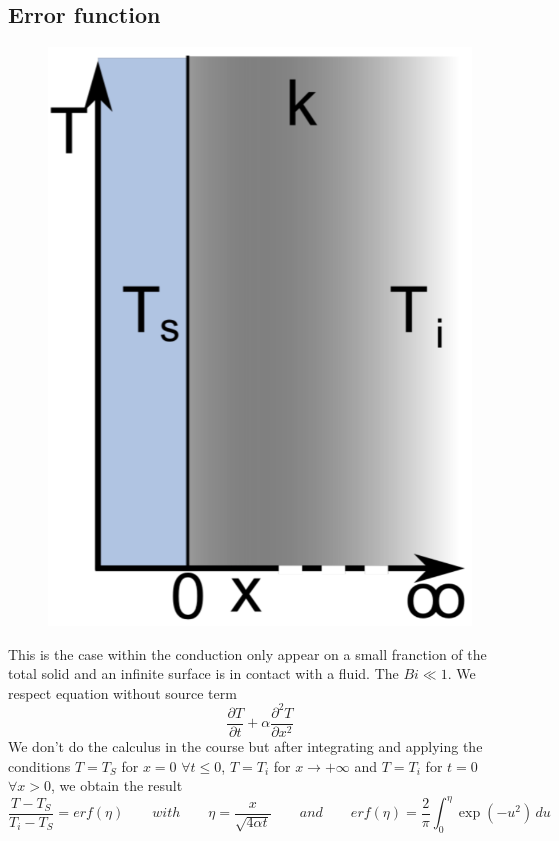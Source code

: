 	\subsection{Error function}
		\begin{figure}
		\vspace{-5mm}
		\includegraphics[scale=0.2]{ch4/2}
		\end{figure}	
		This is the case within the conduction only appear on a small franction of the total solid and an infinite surface is in contact with a fluid. The $Bi \ll 1$. We respect equation without source term 
		\begin{equation}
			\frac{\partial T}{\partial t} + \alpha \frac{\partial ^2 T}{\partial x^2 }
		\end{equation}
		We don't do the calculus in the course but after integrating and applying the conditions $T = T_S$ for $x=0$ $\forall t \leq 0$, $T = T_i$ for $x\rightarrow + \infty$ and $T = T_i$ for $t=0$ $\forall x > 0$, we obtain the result 
		\begin{equation}
			\frac{T-T_S}{T_i-T_S} = erf(\eta ) \qquad with \qquad \eta = \frac{x}{\sqrt{4\alpha t}} \qquad and \qquad erf(\eta ) = \frac{2}{\pi} \int _0 ^\eta \exp (-u^2) \, du
		\end{equation}
		
